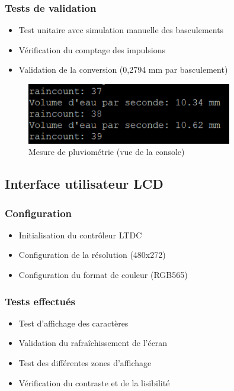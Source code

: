 \documentclass[12pt]{article}
\begin{document}
\subsubsection{Tests de validation}
\begin{itemize}
    \item Test unitaire avec simulation manuelle des basculements
    \item Vérification du comptage des impulsions
    \item Validation de la conversion (0,2794 mm par basculement)
\end{itemize}

\begin{figure}[H]
    \capstart
    \centering
    \includegraphics[width=0.8\textwidth]{./images/test_unit_rain.png}
    \caption{Mesure de pluviométrie (vue de la console)}
    \label{fig:pluviometrie}
\end{figure}

\subsection{Interface utilisateur LCD}
\subsubsection{Configuration}
\begin{itemize}
    \item Initialisation du contrôleur LTDC
    \item Configuration de la résolution (480x272)
    \item Configuration du format de couleur (RGB565)
\end{itemize}

\subsubsection{Tests effectués}
\begin{itemize}
    \item Test d'affichage des caractères
    \item Validation du rafraîchissement de l'écran
    \item Test des différentes zones d'affichage
    \item Vérification du contraste et de la lisibilité
\end{itemize}
\end{document}
